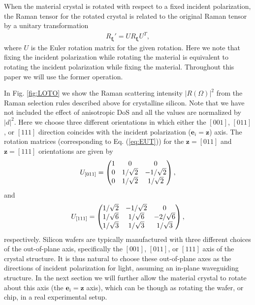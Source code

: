 \documentclass[%
 reprint,
superscriptaddress,
 amsmath,amssymb,
 aps,
pra,
]{revtex4-1}
\newcommand{\mb}[1]{\mathbf{#1}} %
\begin{document}
When the material crystal is rotated with respect to a fixed incident polarization, the Raman tensor for the rotated crystal is related to the original Raman tensor by a unitary transformation
\begin{align}\label{eq:EUT}
R_{\boldsymbol{\xi}}'=UR_{\boldsymbol{\xi}}U^{T},
\end{align}
where $U$ is the Euler rotation matrix for the given rotation. Here we note that fixing the incident polarization while rotating the material is equivalent to rotating the incident polarization while fixing the material. Throughout this paper we will use the former operation.








In Fig. \ref{fig:LOTO} we show the Raman scattering intensity $|R(\Omega)|^2$ from the Raman selection rules described above for crystalline silicon. Note that we have not included the effect of anisotropic DoS and all the values are normalized by $|d|^2$. Here we choose three different orientations in which either the $[001]$, $[011]$, or $[111]$ direction coincides with the incident polarization ($\mb{e}_i=\mb{z}$) axis. The rotation matrices (corresponding to Eq. (\ref{eq:EUT})) for the $\mb{z}=[011]$ and $\mb{z}=[111]$ orientations are given by 
\begin{align}
U_{[011]}=\begin{pmatrix}
		1 & 0 & 0\\
		0 & 1/\sqrt{2} & -1/\sqrt{2}\\
		0 & 1/\sqrt{2} &1/\sqrt{2}\\
	\end{pmatrix}, \notag
\end{align}
and
\begin{align}
U_{[111]}=\begin{pmatrix}
		1/\sqrt{2} & -1/\sqrt{2} & 0\\
		1/\sqrt{6} & 1/\sqrt{6} & -2/\sqrt{6}\\
		1/\sqrt{3} & 1/\sqrt{3} &1/\sqrt{3}\\
	\end{pmatrix}, \notag
\end{align}
respectively. Silicon wafers are typically manufactured with three different choices of the out-of-plane axis, specifically the $[001]$, $[011]$, or $[111]$ axis of the crystal structure. It is thus natural to choose these out-of-plane axes as the directions of incident polarization for light, assuming an in-plane waveguiding structure. In the next section we will further allow the material crystal to rotate about this axis (the $\mb{e}_i=\mb{z}$ axis), which can be though as rotating the wafer, or chip, in a real experimental setup.
\end{document}
